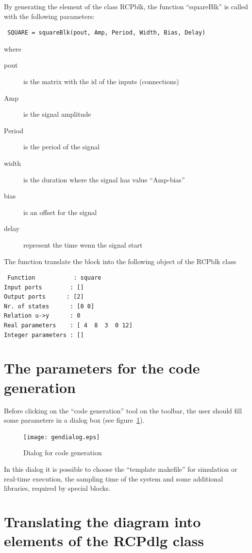  By generating the element of the class RCPblk, the function ``squareBlk'' is 
called with the following parameters:
 
 \begin{verbatim}
 SQUARE = squareBlk(pout, Amp, Period, Width, Bias, Delay)
 \end{verbatim}
 
 where
 
 \begin{description}
 \item[pout] is the matrix with the id of the inputs (connections)
 \item [Amp] is the signal amplitude
 \item [Period] is the period of the signal
 \item [width] is the duration where the signal has value ``Amp-bias''
 \item [bias] is an offset for the signal
 \item [delay] represent the time wenn the signal start
 \end{description}
 
 The function translate the block into the following object of the RCPblk class
 
 \begin{verbatim}
 Function           : square
Input ports        : []
Output ports      : [2]
Nr. of states      : [0 0]
Relation u->y      : 0
Real parameters    : [ 4  8  3  0 12]
Integer parameters : []
\end{verbatim}

\section{The parameters for the code generation}

Before clicking on the ``code generation'' tool on the toolbar, the user should 
fill some parameters in a dialog box (see figure~\ref{codedlg}).

 \begin{figure}[htbp]	%
 \centering
 \texttt{[image: gendialog.eps]}
 \caption{Dialog for code generation}
 \label{codedlg}
 \end{figure}

In this dialog it is possible to choose the ``template makefile'' for 
simulation or real-time execution, the sampling time of the system and some 
additional libraries, required by special blocks.

\section{Translating the diagram into elements of the RCPdlg class}
\label{Sect-IO}

